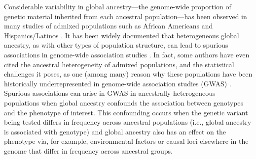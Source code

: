 \documentclass[12pt]{article}
\begin{document}


Considerable variability in global ancestry---the genome-wide proportion of genetic material inherited from each ancestral population---has been observed in many studies of admixed populations such as African Americans and Hispanics/Latinos \citep{parra1998, tishkoff2009, bryc2010aa, bryc2010hl, conomos2016}.
It has been widely documented that heterogeneous global ancestry, as with other types of population structure, can lead to spurious associations in genome-wide association studies \citep{GenomicControl, eigenstrat, marchini2004, price2010}. 
In fact, some authors have even cited the ancestral heterogeneity of admixed populations, and the statistical challenges it poses, as one (among many) reason why these populations have been historically underrepresented in genome-wide association studies (GWAS) \citep{need2009, bustamante2011, popejoy2016, hindorff2018, manolio2019}.
Spurious associations can arise in GWAS in ancestrally heterogeneous populations when global ancestry confounds the association between genotypes and the phenotype of interest.%
This confounding occurs when the genetic variant being tested differs in frequency across ancestral populations (i.e., global ancestry is associated with genotype) and global ancestry also has an effect on the phenotype via, for example, environmental factors or causal loci elsewhere in the genome that differ in frequency across ancestral groups.

\end{document}

